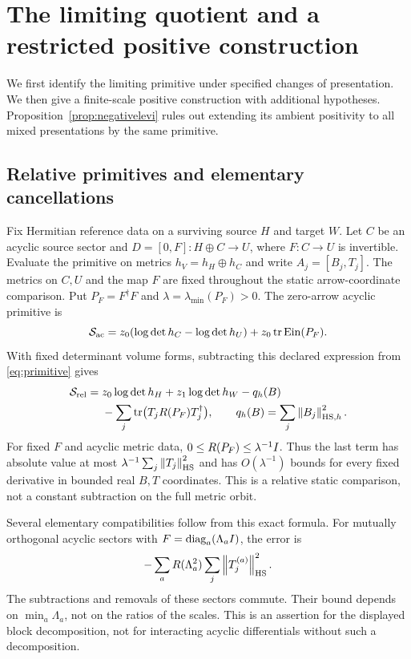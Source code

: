 \section{The limiting quotient and a restricted positive construction}
\label{sec:geometry}

We first identify the limiting primitive under specified changes of
presentation. We then give a finite-scale positive construction with
additional hypotheses. Proposition~\ref{prop:negativelevi} rules out
extending its ambient positivity to all mixed presentations by the same
primitive.

\subsection{Relative primitives and elementary cancellations}
Fix Hermitian reference data on a surviving source $H$ and target $W$.
Let $C$ be an acyclic source sector and
$D=[0,F]:H\oplus C\to U$, where $F:C\to U$ is invertible.
Evaluate the primitive on metrics $h_V=h_H\oplus h_C$ and write
$A_j=[B_j,T_j]$. The metrics on $C,U$ and the map $F$ are fixed
throughout the static arrow-coordinate comparison.
Put $P_F=F^\dagger F$ and
$\lambda=\lambda_{\min}(P_F)>0$.
The zero-arrow acyclic primitive is
\begin{equation}\label{eq:acyclicprimitive}
 \mathcal S_{\mathrm{ac}}
 =z_0(\log\det h_C-\log\det h_U)+z_0\operatorname{tr}\operatorname{Ein}(P_F).
\end{equation}
With fixed determinant volume forms, subtracting this declared
expression from \eqref{eq:primitive} gives
\begin{equation}\label{eq:relativeprimitive}
 \begin{split}
 \mathcal S_{\mathrm{rel}}
 ={}&z_0\log\det h_H+z_1\log\det h_W-q_h(B)\\
 &-\sum_j\operatorname{tr}\bigl(T_jR(P_F)T_j^\dagger\bigr),\qquad
 q_h(B)=\sum_j\left\lVert B_j\right\rVert_{\mathrm{HS},h}^2 .
 \end{split}
\end{equation}
For fixed $F$ and acyclic metric data,
$0\leq R(P_F)\leq\lambda^{-1}I$.
Thus the last term has absolute value at most
$\lambda^{-1}\sum_j\left\lVert T_j\right\rVert_{\mathrm{HS}}^2$ and has
$O(\lambda^{-1})$ bounds for every fixed derivative in bounded
real $B,T$ coordinates. This is a relative static comparison, not
a constant subtraction on the full metric orbit.

Several elementary compatibilities follow from this exact formula.
For mutually orthogonal acyclic sectors with
$F=\operatorname{diag}_a(\Lambda_aI)$, the error is
\begin{equation}\label{eq:sectorerror}
 -\sum_aR(\Lambda_a^2)\sum_j\left\lVert T_j^{(a)}\right\rVert_{\mathrm{HS}}^2.
\end{equation}
The subtractions and removals of these sectors commute. Their bound
depends on $\min_a\Lambda_a$, not on the ratios of the scales.
This is an assertion for the displayed block decomposition, not
for interacting acyclic differentials without such a decomposition.

